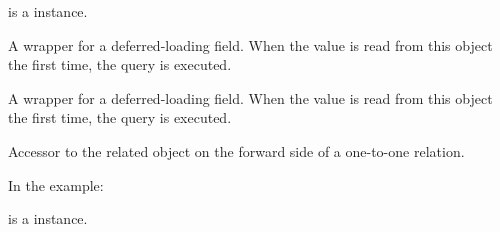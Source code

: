 \documentclass[letterpaper,10pt,english]{sphinxmanual}
\begin{document}
\begin{fulllineitems}
\begin{fulllineitems}
 is a  instance.

\end{fulllineitems}


\begin{fulllineitems}
\label{\detokenize{QuChemPedIA.models:QuChemPedIA.models.ImportRuleModel.ImportRule.id_job_type_id}}
A wrapper for a deferred-loading field. When the value is read from this
object the first time, the query is executed.

\end{fulllineitems}


\begin{fulllineitems}
\label{\detokenize{QuChemPedIA.models:QuChemPedIA.models.ImportRuleModel.ImportRule.id_rule}}
A wrapper for a deferred-loading field. When the value is read from this
object the first time, the query is executed.

\end{fulllineitems}


\begin{fulllineitems}
\label{\detokenize{QuChemPedIA.models:QuChemPedIA.models.ImportRuleModel.ImportRule.id_software}}
Accessor to the related object on the forward side of a one-to-one relation.

In the example:

%
\begin{sphinxVerbatim}[commandchars=\\\{\}]
 
       
\end{sphinxVerbatim}

 is a  instance.


\end{fulllineitems}
\end{fulllineitems}
\end{document}
